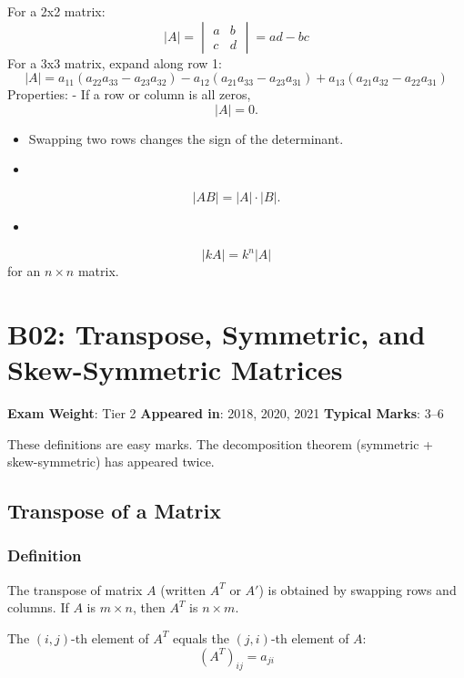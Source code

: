 \documentclass[
]{article}
\providecommand{\tightlist}{%
  \setlength{\itemsep}{0pt}\setlength{\parskip}{0pt}}
\renewenvironment{quote}
  {\begin{tcolorbox}[
     colback=calloutbg,
     colframe=calloutframe,
     colupper=callouttext,
     arc=3pt,
     boxrule=0.5pt,
     leftrule=0.5pt,
     borderline west={3pt}{0pt}{calloutaccent},
     left=8pt,
     right=8pt,
     top=6pt,
     bottom=6pt
   ]}
  {\end{tcolorbox}}
\begin{document}
For a 2x2 matrix:
\[
|A| =
\begin{vmatrix}
a & b \\
c & d
\end{vmatrix} = ad - bc
\]
For a 3x3 matrix, expand along row 1:
\[
|A| = a_{11}(a_{22}a_{33} - a_{23}a_{32}) - a_{12}(a_{21}a_{33} - a_{23}a_{31}) + a_{13}(a_{21}a_{32} - a_{22}a_{31})
\]
Properties: - If a row or column is all zeros,
\[
\lvert A \rvert = 0.
\]
\begin{itemize}
\tightlist
\item
  Swapping two rows changes the sign of the determinant.
\item
\end{itemize}
\[
\lvert AB \rvert = \lvert A \rvert \cdot \lvert B \rvert.
\]
\begin{itemize}
\tightlist
\item
\end{itemize}
\[
\lvert kA \rvert = k^n \lvert A \rvert
\]
for an \(n \times n\) matrix.

\section{B02: Transpose, Symmetric, and Skew-Symmetric
Matrices}\label{b02-transpose-symmetric-and-skew-symmetric-matrices}

\begin{quote}
\textbf{Exam Weight}: Tier 2 \textbar{} \textbf{Appeared in}: 2018,
2020, 2021 \textbar{} \textbf{Typical Marks}: 3--6
\end{quote}

These definitions are easy marks. The decomposition theorem (symmetric +
skew-symmetric) has appeared twice.

\subsection{Transpose of a Matrix}\label{transpose-of-a-matrix}

\subsubsection{Definition}\label{definition-5}

The transpose of matrix \(A\) (written \(A^T\) or \(A'\)) is obtained by
swapping rows and columns. If \(A\) is \(m \times n\), then \(A^T\) is
\(n \times m\).

The \((i,j)\)-th element of \(A^T\) equals the \((j,i)\)-th element of
\(A\):
\[
(A^T)_{ij} = a_{ji}
\]
\end{document}
